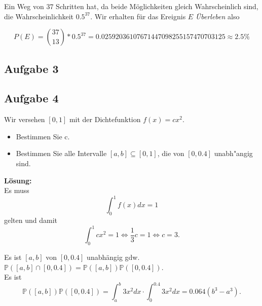 \documentclass[11pt,a4paper,ngerman]{article}
\newcommand{\Prob}{\mathbb{P}}
\begin{document}
Ein Weg von $37$ Schritten hat, da beide Möglichkeiten gleich Wahrscheinlich sind, die Wahrscheinlichkeit $0.5^{37}$. Wir erhalten für
das Ereignis $E$ \emph{Überleben} also

\[
    P(E) = \binom{37}{13} * 0.5^{37} = 0.02592036107671447098255157470703125 \approx 2.5\%
\]

\subsection*{Aufgabe 3}


\subsection*{Aufgabe 4}

Wir versehen $[0, 1]$ mit der Dichtefunktion $f(x) = cx^2$.
\begin{itemize}
  \item Bestimmen Sie c.
  \item Bestimmen Sie alle Intervalle $[a, b] \subseteq [0, 1]$, die von $[0,
  0.4]$ unabh"angig sind.

\end{itemize}

\textbf{Lösung:}\\

Es muss
\[
    \int_0^1 f(x) dx = 1
\] gelten und damit
\[
    \int_0^1 c x^2 = 1 \Leftrightarrow \frac{1}{3}c = 1 \Leftrightarrow c = 3.
\]

Es ist $[a,b]$ von $[0,0.4]$ unabhängig gdw. $\Prob([a,b] \cap [0,0.4]) = \Prob([a,b]) \Prob([0,0.4])$.\\
Es ist
\[
    \Prob([a,b]) \Prob([0,0.4]) = \int_a^b 3x^2 dx \cdot \int_0^{0.4} 3x^2 dx = 0.064 (b^3 - a^3).
\]
\end{document}
